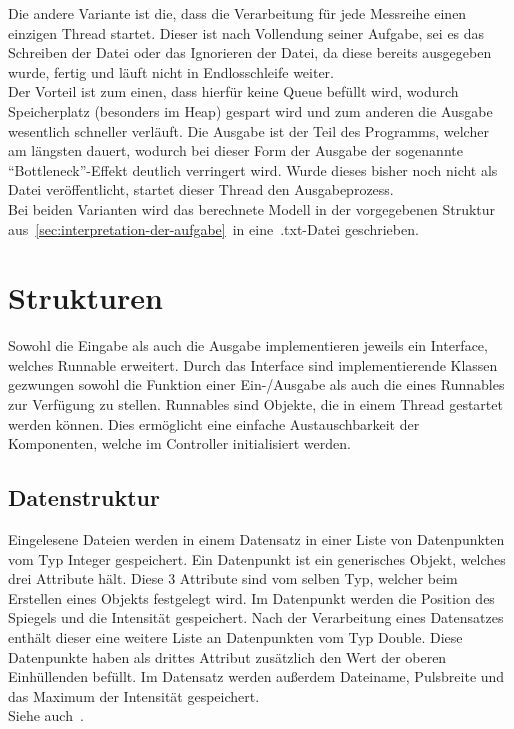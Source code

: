 Die andere Variante ist die, dass die Verarbeitung für jede Messreihe einen einzigen Thread startet.
Dieser ist nach Vollendung seiner Aufgabe, sei es das Schreiben der Datei oder das Ignorieren der Datei, da diese bereits ausgegeben wurde, fertig und läuft nicht in Endlosschleife weiter.\\
Der Vorteil ist zum einen, dass hierfür keine Queue befüllt wird, wodurch Speicherplatz (besonders im Heap) gespart wird und zum anderen die Ausgabe wesentlich schneller verläuft.
Die Ausgabe ist der Teil des Programms, welcher am längsten dauert, wodurch bei dieser Form der Ausgabe der sogenannte \enquote{Bottleneck}-Effekt deutlich verringert wird.
Wurde dieses bisher noch nicht als Datei veröffentlicht, startet dieser Thread den Ausgabeprozess.\\
Bei beiden Varianten wird das berechnete Modell in der vorgegebenen Struktur aus~\autoref{sec:interpretation-der-aufgabe}~in eine~.txt-Datei geschrieben.


\section{Strukturen}\label{subsec:strukturen}
Sowohl die Eingabe als auch die Ausgabe implementieren jeweils ein Interface, welches Runnable erweitert.
Durch das Interface sind implementierende Klassen gezwungen sowohl die Funktion einer Ein-/Ausgabe als auch die eines Runnables zur Verfügung zu stellen.
Runnables sind Objekte, die in einem Thread gestartet werden können.
Dies ermöglicht eine einfache Austauschbarkeit der Komponenten, welche im Controller initialisiert werden.

\subsection{Datenstruktur}\label{subsec:datenstruktur}
Eingelesene Dateien werden in einem Datensatz in einer Liste von Datenpunkten vom Typ Integer gespeichert.
Ein Datenpunkt ist ein generisches Objekt, welches drei Attribute hält.
Diese 3 Attribute sind vom selben Typ, welcher beim Erstellen eines Objekts festgelegt wird.
Im Datenpunkt werden die Position des Spiegels und die Intensität gespeichert.
Nach der Verarbeitung eines Datensatzes enthält dieser eine weitere Liste an Datenpunkten vom Typ Double.
Diese Datenpunkte haben als drittes Attribut zusätzlich den Wert der oberen Einhüllenden befüllt.
Im Datensatz werden außerdem Dateiname, Pulsbreite und das Maximum der Intensität gespeichert.\\
Siehe auch~.

